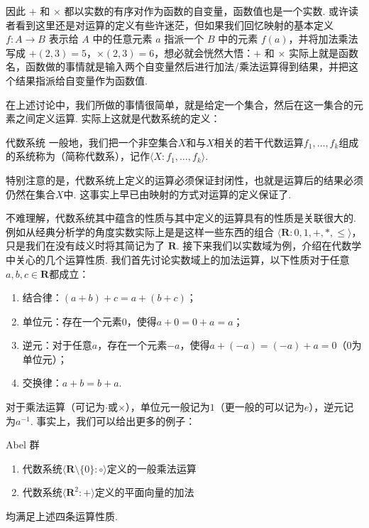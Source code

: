 因此 $+$ 和 $\times$ 都以实数的有序对作为函数的自变量，函数值也是一个实数. 或许读者看到这里还是对运算的定义有些许迷茫，但如果我们回忆映射的基本定义 $f \colon A \to B$ 表示给 $A$ 中的任意元素 $a$ 指派一个 $B$ 中的元素 $f(a)$，并将加法乘法写成 $+(2,3) = 5$，$\times(2,3) = 6$，想必就会恍然大悟：$+$ 和 $\times$ 实际上就是函数名，函数做的事情就是输入两个自变量然后进行加法/乘法运算得到结果，并把这个结果指派给自变量作为函数值.

在上述讨论中，我们所做的事情很简单，就是给定一个集合，然后在这一集合的元素之间定义运算. 实际上这就是代数系统的定义：
\begin{definition}{代数系统}{} 
    一般地，我们把一个非空集合$X$和与$X$相关的若干代数运算$f_1,\ldots,f_k$组成的系统称为（简称代数系），记作$\langle X \colon f_1,\ldots,f_k\rangle$.
\end{definition}

特别注意的是，代数系统上定义的运算必须保证封闭性，也就是运算后的结果必须仍然在集合$X$中. 这事实上早已由映射的方式对运算的定义保证了.

不难理解，代数系统其中蕴含的性质与其中定义的运算具有的性质是关联很大的. 例如从经典分析学的角度实数实际上是是这样一些东西的组合 $\langle\mathbf{R}\colon 0, 1, +, *, \leqslant\rangle$，只是我们在没有歧义时将其简记为了 $\mathbf{R}$. 接下来我们以实数域为例，介绍在代数学中关心的几个运算性质. 我们首先讨论实数域上的加法运算，以下性质对于任意$a,b,c\in\mathbf{R}$都成立：

\begin{enumerate}
    \item 结合律：$(a+b)+c=a+(b+c)$；

    \item 单位元：存在一个元素$0$，使得$a+0=0+a=a$；

    \item 逆元：对于任意$a$，存在一个元素$-a$，使得$a+(-a)=(-a)+a=0$（0为单位元）；

    \item 交换律：$a+b=b+a$.
\end{enumerate}

对于乘法运算（可记为$\cdot$或$\times$），单位元一般记为$1$（更一般的可以记为$e$），逆元记为$a^{-1}$. 事实上，我们可以给出更多的例子：
\begin{example}{}{Abel 群}
    \begin{enumerate}
        \item 代数系统$\langle \mathbf{R}\setminus\{0\}\colon\circ\rangle$定义的一般乘法运算

        \item 代数系统$\langle \mathbf{R}^2\colon+\rangle$定义的平面向量的加法
    \end{enumerate}
    均满足上述四条运算性质.
\end{example}

